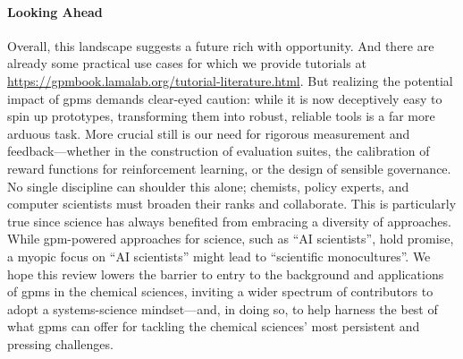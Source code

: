 \paragraph{Looking Ahead} Overall, this landscape suggests a future rich with opportunity. And there are already some practical use cases for which we provide tutorials at \url{https://gpmbook.lamalab.org/tutorial-literature.html}.
But realizing the potential impact of \glspl{gpm} demands clear-eyed caution: while it is now deceptively easy to spin up prototypes, transforming them into robust, reliable tools is a far more arduous task. \autocite{sculley2014machine}
More crucial still is our need for rigorous measurement and feedback---whether in the construction of evaluation suites, the calibration of reward functions for reinforcement learning, or the design of sensible governance. 
No single discipline can shoulder this alone; chemists, policy experts, and computer scientists must broaden their ranks and collaborate. 
This is particularly true since science has always benefited from embracing a diversity of approaches. 
While \gls{gpm}-powered approaches for science, such as \enquote{AI scientists}, hold promise, a myopic focus on \enquote{AI scientists} might lead to \enquote{scientific monocultures}.\autocite{Savitsky_2025} 
We hope this review lowers the barrier to entry to the background and applications of \glspl{gpm} in the chemical sciences, inviting a wider spectrum of contributors to adopt a systems-science mindset---and, in doing so, to help harness the best of what \glspl{gpm} can offer for tackling the chemical sciences’ most persistent and pressing challenges.
